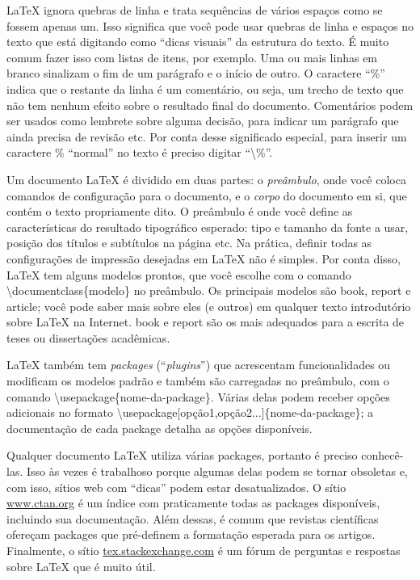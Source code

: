 \LaTeX{} ignora quebras de linha e trata sequências de vários espaços como
se fossem apenas um. Isso significa que você pode usar quebras de linha e
espaços no texto que está digitando como ``dicas visuais'' da estrutura do
texto. É muito comum fazer isso com listas de itens, por exemplo. Uma ou
mais linhas em branco sinalizam o fim de um parágrafo e o início de outro.
O caractere ``\%'' indica que o restante da linha é um comentário,
ou seja, um trecho de texto que não tem nenhum efeito sobre o resultado final
do documento. Comentários podem ser usados como lembrete sobre alguma decisão,
para indicar um parágrafo que ainda precisa de revisão etc. Por conta desse
significado especial, para inserir um caractere \% ``normal'' no
texto é preciso digitar ``\textsf{\textbackslash\%}''.

Um documento \LaTeX{} é dividido em duas partes: o \emph{preâmbulo}, onde
você coloca comandos de configuração para o documento, e o \emph{corpo} do
documento em si, que contém o texto propriamente dito. O preâmbulo é onde
você define as características do resultado tipográfico esperado: tipo e
tamanho da fonte a usar, posição dos títulos e subtítulos na página etc.
Na prática, definir todas as configurações de impressão desejadas em
\LaTeX{} não é simples. Por conta disso, \LaTeX{} tem alguns modelos
prontos, que você escolhe com o comando
\textsf{\textbackslash{}documentclass\{modelo\}} no preâmbulo. Os
principais modelos são \textsf{book}, \textsf{report} e \textsf{article};
você pode saber mais sobre eles (e outros) em qualquer texto introdutório
sobre \LaTeX{} na Internet. \textsf{book} e \textsf{report} são os mais
adequados para a escrita de teses ou dissertações acadêmicas.

\LaTeX{} também tem \textit{packages} (``\textit{plugins}'') que acrescentam
funcionalidades ou modificam os modelos padrão e também são carregadas no
preâmbulo, com o comando \textsf{\textbackslash{}usepackage\{nome-da-package\}}.
Várias delas podem receber opções adicionais no formato
\textsf{\textbackslash{}usepackage[opção1,opção2...]\{nome-da-package\}};
a documentação de cada package detalha as opções disponíveis.

Qualquer documento \LaTeX{} utiliza várias packages, portanto é preciso
conhecê-las. Isso às vezes é trabalhoso porque algumas delas podem se
tornar obsoletas e, com isso, sítios web com ``dicas'' podem estar
desatualizados. O sítio \url{www.ctan.org} é um índice com praticamente
todas as packages disponíveis, incluindo sua documentação. Além dessas,
é comum que revistas científicas ofereçam packages que pré-definem a
formatação esperada para os artigos. Finalmente, o sítio
\url{tex.stackexchange.com} é um fórum de perguntas e respostas sobre
\LaTeX{} que é muito útil.

